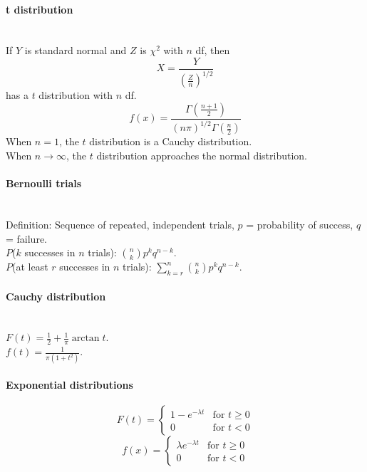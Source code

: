 \documentclass[10pt]{article}
\begin{document}
\paragraph{t distribution}\ \\
If $Y$ is standard normal and $Z$ is $\chi^2$ with $n$ df, then
\begin{equation*}X=\frac{Y}{\left(\frac{Z}{n}\right)^{1/2}}\end{equation*}
has a $t$ distribution with $n$ df.
\begin{equation*}
f(x)=\frac{\Gamma\left(\frac{n+1}{2}\right)}{(n\pi)^{1/2}\Gamma\left(\frac{n}{2}\right)}
\end{equation*}
When $n = 1$, the $t$ distribution is a Cauchy distribution.\\
When $n \to \infty$, the $t$ distribution approaches the normal distribution.

\paragraph{Bernoulli trials}\ \\
Definition: Sequence of repeated, independent trials, $p$ = probability of success, $q$ = failure.\\
$P$($k$ successes in $n$ trials): $\binom{n}{k}p^kq^{n-k}$.\\
$P$(at least $r$ successes in $n$ trials): $\sum_{k=r}^n \binom{n}{k} p^k q^{n-k}$.

\paragraph{Cauchy distribution}\ \\
$F(t) = \frac{1}{2} + \frac{1}{\pi} \arctan t$.\\
$f(t) = \frac{1}{\pi (1 + t^2)}$.

\paragraph{Exponential distributions}
\begin{equation*}
F(t) = 
\begin{cases}
1 - e^{-\lambda t} & \text{for } t \geq 0 \\
0 & \text{for } t < 0
\end{cases}
\end{equation*}
\begin{equation*}f(x) = \begin{cases}
\lambda e^{-\lambda t} & \text{for } t \geq 0\\
0 & \text{for } t < 0
\end{cases}\end{equation*}
\end{document}
